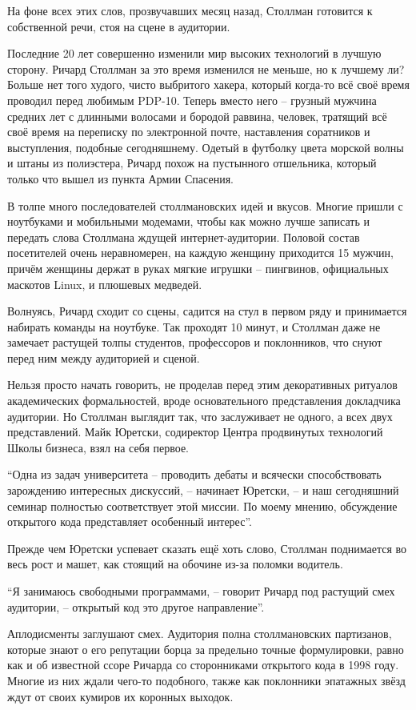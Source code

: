 На фоне всех этих слов, прозвучавших месяц назад, Столлман готовится к собственной речи, стоя на сцене в аудитории.

Последние 20 лет совершенно изменили мир высоких технологий в лучшую сторону. Ричард Столлман за это время изменился не меньше, но к лучшему ли? Больше нет того худого, чисто выбритого хакера, который когда-то всё своё время проводил перед любимым PDP-10. Теперь вместо него -- грузный мужчина средних лет с длинными волосами и бородой раввина, человек, тратящий всё своё время на переписку по электронной почте, наставления соратников и выступления, подобные сегодняшнему. Одетый в футболку цвета морской волны и штаны из полиэстера, Ричард похож на пустынного отшельника, который только что вышел из пункта Армии Спасения.

В толпе много последователей столлмановских идей и вкусов. Многие пришли с ноутбуками и мобильными модемами, чтобы как можно лучше записать и передать слова Столлмана ждущей интернет-аудитории. Половой состав посетителей очень неравномерен, на каждую женщину приходится 15 мужчин, причём женщины держат в руках мягкие игрушки -- пингвинов, официальных маскотов Linux, и плюшевых медведей.

Волнуясь, Ричард сходит со сцены, садится на стул в первом ряду и принимается набирать команды на ноутбуке. Так проходят 10 минут, и Столлман даже не замечает растущей толпы студентов, профессоров и поклонников, что снуют перед ним между аудиторией и сценой.

Нельзя просто начать говорить, не проделав перед этим декоративных ритуалов академических формальностей, вроде основательного представления докладчика аудитории. Но Столлман выглядит так, что заслуживает не одного, а всех двух представлений. Майк Юретски, содиректор Центра продвинутых технологий Школы бизнеса, взял на себя первое. 

``Одна из задач университета -- проводить дебаты и всячески способствовать зарождению интересных дискуссий, -- начинает Юретски, -- и наш сегодняшний семинар полностью соответствует этой миссии. По моему мнению, обсуждение открытого кода представляет особенный интерес''.

Прежде чем Юретски успевает сказать ещё хоть слово, Столлман поднимается во весь рост и машет, как стоящий на обочине из-за поломки водитель.

``Я занимаюсь свободными программами, -- говорит Ричард под растущий смех аудитории, -- открытый код это другое направление''.

Аплодисменты заглушают смех. Аудитория полна столлмановских партизанов, которые знают о его репутации борца за предельно точные формулировки, равно как и об известной ссоре Ричарда со сторонниками открытого кода в 1998 году. Многие из них ждали чего-то подобного, также как поклонники эпатажных звёзд ждут от своих кумиров их коронных выходок.

